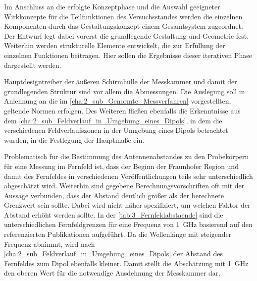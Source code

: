 

Im Anschluss an die erfolgte Konzeptphase und die Auswahl geeigneter Wirkkonzepte für die Teilfunktionen des Versuchsstandes werden die einzelnen Komponenten durch das Gestaltungskonzept einem Gesamtsystem zugeordnet. Der Entwurf legt dabei vorerst die grundlegende Gestaltung und Geometrie fest. Weiterhin werden strukturelle Elemente entwickelt, die zur Erfüllung der einzelnen Funktionen beitragen. Hier sollen die Ergebnisse dieser iterativen Phase dargestellt werden. 
\par
\vspace{\linespace}
Hauptdesigntreiber der äußeren Schirmhülle der Messkammer und damit der grundlegenden Struktur sind vor allem die Abmessungen. Die Auslegung soll in Anlehnung an die im \Abschnitt\ref{cha:2_sub_Genormte_Messverfahren} vorgestellten, geltende Normen erfolgen. Des Weiteren fließen ebenfalls die Erkenntnisse aus dem \Abschnitt\ref{cha:2_sub_Feldverlauf_in_Umgebung_eines_Dipols}, in dem die verschiedenen Feldverlaufszonen in der Umgebung eines Dipols betrachtet wurden, in die Festlegung der Hauptmaße ein.
\par
\vspace{\linespace}
Problematisch für die Bestimmung des Antennenabstandes zu den Probekörpern für eine Messung im Fernfeld ist, dass der Beginn der Fraunhofer Region und damit des Fernfeldes in verschiedenen Veröffentlichungen teils sehr unterschiedlich abgeschätzt wird. Weiterhin sind gegebene Berechnungsvorschriften oft mit der Aussage verbunden, dass der Abstand deutlich größer als der berechnete Grenzwert sein sollte. Dabei wird nicht näher spezifiziert, um welchen Faktor der Abstand erhöht werden sollte. In der \Tabelle\ref{tab:3_Fernfeldabstaende} sind die unterschiedlichen Fernfeldgrenzen für eine Frequenz von \SI{1}{\giga\hertz} basierend auf den referenzierten Publikationen aufgeführt. Da die Wellenlänge mit steigender Frequenz abnimmt, wird nach \Abschnitt\ref{cha:2_sub_Feldverlauf_in_Umgebung_eines_Dipols} der Abstand des Fernfeldes zum Dipol ebenfalls kleiner. Damit stellt die Abschätzung mit \SI{1}{\giga\hertz} den oberen Wert für die notwendige Ausdehnung der Messkammer dar.
\par
\vspace{\linespace}


